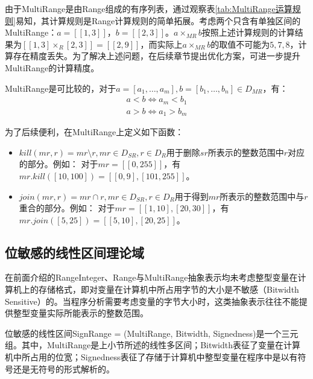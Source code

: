 由于MultiRange是由Range组成的有序列表，通过观察表\ref{tab:MultiRange运算规则}易知，其计算规则是Range计算规则的简单拓展。考虑两个只含有单独区间的MultiRange：$ a = [[1, 3]]$，$ b = [[2, 3]] $。$ a \times_{MR} b $按照上述计算规则的计算结果为$ [[1, 3] \times_R [2, 3]]  = [[2, 9]] $，而实际上$ a \times_{MR} b $的取值不可能为$ 5, 7, 8 $，计算存在精度丢失。为了解决上述问题，在后续章节提出优化方案，可进一步提升MultiRange的计算精度。

MultiRange是可比较的，对于$ a = [a_1, \dots, a_m], b = [b_1, \dots, b_n] \in D_{MR}$，有：
\begin{align}
	a < b \iff a_m < b_1\\
	a > b \iff a_1 > b_m
\end{align}

为了后续便利，在MultiRange上定义如下函数：
\begin{itemize}
	\item $ kill(mr, r) = mr \setminus r, mr \in D_{SR}, r \in D_R$用于删除$ sr $所表示的整数范围中$ r $对应的部分。例如：
	对于$ mr = [[0, 255]] $，有$ mr.kill([10, 100]) = [[0, 9],  [101, 255]] $。
	
	\item $ join(mr, r) = mr \cap r, mr \in D_{SR}, r \in D_R $用于得到$ mr $所表示的整数范围中与$ r $重合的部分。例如：
	对于$ mr = [[1, 10], [20, 30]] $，有$ mr.join([5, 25]) = [[5, 10], [20, 25]] $。
\end{itemize}

\subsection{位敏感的线性区间理论域}
\label{sec:SignRange}

在前面介绍的RangeInteger、Range与MultiRange抽象表示均未考虑整型变量在计算机上的存储格式，即对变量在计算机中所占用字节的大小是不敏感（Bitwidth Sensitive）的。当程序分析需要考虑变量的字节大小时，这类抽象表示往往不能提供整型变量实际所能表示的整数范围。

位敏感的线性区间SignRange = (MultiRange, Bitwidth, Signedness)是一个三元组。其中，MultiRange是上小节所述的线性多区间；Bitwidth表征了变量在计算机中所占用的位宽；Signedness表征了存储于计算机中整型变量在程序中是以有符号还是无符号的形式解析的。

